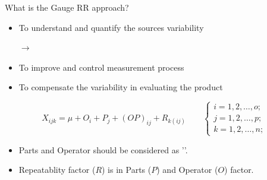 \begin{frame}
    [t]
    {What is the Gauge RR approach?}
    \vspace{0.5em}
    \\
    \begin{itemize}
        \footnotesize
        \item To understand and quantify the sources variability\\
        {\scriptsize $\rightarrow$ \par}
        \item To improve and control measurement process
        \item To compensate the variability in evaluating the product
    \end{itemize}
    \vspace{1em}
    \vspace{-1em}
    {\footnotesize \begin{equation*}
        X_{ijk} = \mu + O_i + P_j + {(OP)}_{ij} + R_{k(ij)}\qquad
        \begin{cases}
            i = 1, 2, \ldots, o;\\
            j = 1, 2, \ldots, p;\\
            k = 1, 2, \ldots, n;
        \end{cases}
    \end{equation*}}
    \vspace{-1em}
    \begin{itemize}
        \footnotesize
        \item Parts and Operator should be considered as ''.
        \item Repeatablity factor ($R$) is  in Parts ($P$) and Operator ($O$) factor. 
    \end{itemize}

\end{frame}